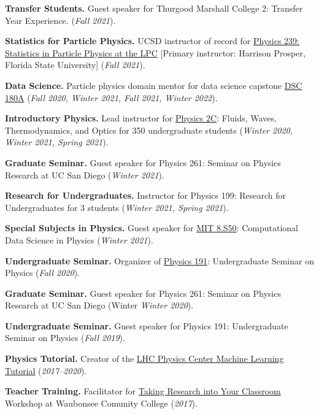 \documentclass{res}
\begin{document}
\begin{resume}
  \textbf{Transfer Students.} Guest speaker for Thurgood Marshall College 2: Transfer Year Experience. (\textit{Fall 2021}).

  \textbf{Statistics for Particle Physics.} UCSD instructor of record for \href{https://indico.cern.ch/event/1066958/}{Physics 239: Statistics in Particle Physics at the LPC} [Primary instructor: Harrison Prosper, Florida State University] (\textit{Fall 2021}).

  \textbf{Data Science.} Particle physics domain mentor for data science capstone \href{https://jmduarte.github.io/capstone-particle-physics-domain}{DSC 180A} (\textit{Fall 2020, Winter 2021, Fall 2021, Winter 2022}).

  \textbf{Introductory Physics.} Lead instructor for \href{https://jduarte.physics.ucsd.edu/phys2c/index.html}{Physics 2C}: Fluids, Waves, Thermodynamics, and Optics for 350 undergraduate students (\textit{Winter 2020, Winter 2021, Spring 2021}).

  \textbf{Graduate Seminar.} Guest speaker for Physics 261: Seminar on Physics Research at UC San Diego (\textit{Winter 2021}).

  \textbf{Research for Undergraduates.} Instructor for Physics 199: Research for Undergraduates for 3 students (\textit{Winter 2021, Spring 2021}).

  \textbf{Special Subjects in Physics.} Guest speaker for \href{https://github.com/violatingcp/MIT_8.S50}{MIT 8.S50}: Computational Data Science in Physics (\textit{Winter 2021}).

  \textbf{Undergraduate Seminar.} Organizer of \href{https://indico.cern.ch/event/956641/}{Physics 191}: Undergraduate Seminar on Physics (\textit{Fall 2020}).

  \textbf{Graduate Seminar.} Guest speaker for Physics 261: Seminar on Physics Research at UC San Diego (Winter \textit{Winter 2020}).

  \textbf{Undergraduate Seminar.} Guest speaker for Physics 191: Undergraduate Seminar on Physics (\textit{Fall 2019}).

  \textbf{Physics Tutorial.} Creator of the \href{https://github.com/FNALLPC/machine-learning-hats}{LHC Physics Center Machine Learning Tutorial} (\textit{2017--2020}).

  \textbf{Teacher Training.} Facilitator for \href{http://eddata.fnal.gov/lasso/program_search/show_workshopID_new.lasso?event_id=435}{Taking Research into Your Classroom} Workshop at Waubonsee Comunity College (\textit{2017}).


\end{resume}
\end{document}
